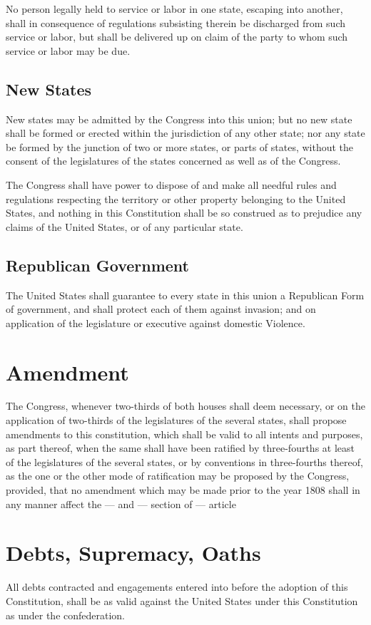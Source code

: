 \documentclass{constitution}
\begin{document}
No person legally held to service or labor in one state, escaping into another,
shall in consequence of regulations subsisting therein be discharged from such service or labor,
but shall be delivered up on claim of the party to whom such service or labor may be due.

\section{New States}
New states may be admitted by the Congress into this union;
but no new state shall be formed or erected within the jurisdiction of any other state;
nor any state be formed by the junction of two or more states, or parts of states,
without the consent of the legislatures of the states concerned as well as of the Congress.

The Congress shall have power to dispose of and make all needful rules and regulations respecting the territory or other property belonging to the United States,
and nothing in this Constitution shall be so construed as to prejudice any claims of the United States, or of any particular state.

\section{Republican Government}
The United States shall guarantee to every state in this union a Republican Form of government,
and shall protect each of them against invasion;
and on application of the legislature or executive against domestic Violence.

\chapter{Amendment}
The Congress, whenever two-thirds of both houses shall deem necessary,
or on the application of two-thirds of the legislatures of the several states,
shall propose amendments to this constitution,
which shall be valid to all intents and purposes, as part thereof,
when the same shall have been ratified by three-fourths at least of the legislatures of the several states,
or by conventions in three-fourths thereof,
as the one or the other mode of ratification may be proposed by the Congress,
provided, that no amendment which may be made prior to the year 1808 shall in any manner affect the — and — section of — article

\chapter{Debts, Supremacy, Oaths}
All debts contracted and engagements entered into before the adoption of this Constitution,
shall be as valid against the United States under this Constitution as under the confederation.
\end{document}
